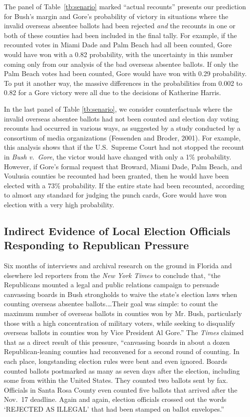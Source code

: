 \documentclass[11pt,titlepage]{article}
\begin{document}
The panel of Table~\ref{tb:senario} marked ``actual recounts''
presents our prediction for Bush's margin and Gore's probability of
victory in situations where the invalid overseas absentee ballots had
been rejected \emph{and} the recounts in one or both of these counties
had been included in the final tally.  For example, if the recounted
votes in Miami Dade and Palm Beach had all been counted, Gore would
have won with a 0.82 probability, with the uncertainty in this number
coming only from our analysis of the bad overseas absentee ballots.
If only the Palm Beach votes had been counted, Gore would have won
with 0.29 probability.  To put it another way, the massive differences
in the probabilities from 0.002 to 0.82 for a Gore victory were all
due to the decisions of Katherine Harris.

In the last panel of Table \ref{tb:senario}, we consider
counterfactuals where the invalid overseas absentee ballots had not
been counted and election day voting recounts had occurred in various
ways, as suggested by a study conducted by a consortium of media
organizations (Fessenden and Broder, 2001).  For example, this
analysis shows that if the U.S.\ Supreme Court had not stopped the
recount in \emph{Bush v.\ Gore}, the victor would have changed with
only a 1\% probability.  However, if Gore's formal request that
Broward, Miami Dade, Palm Beach, and Voulusia counties be recounted
had been granted, then he would have been elected with a 73\%
probability.  If the entire state had been recounted, according to
almost any standard for judging the punch cards, Gore would have won
election with a very high probability.

\subsection{Indirect Evidence of Local Election Officials Responding
  to Republican Pressure}

Six months of interviews and archival research on the ground in
Florida and elsewhere led reporters from the \emph{New York Times}
to conclude that, ``the Republicans mounted a legal and public
relations campaign to persuade canvassing boards in Bush strongholds
to waive the state's election laws when counting overseas absentee
ballots.\ldots Their goal was simple: to count the maximum number of
overseas ballots in counties won by Mr.  Bush, particularly those with
a high concentration of military voters, while seeking to disqualify
overseas ballots in counties won by Vice President Al Gore.''  The
\emph{Times} claimed that as a direct result of this pressure,
``canvassing boards in about a dozen Republican-leaning counties had
reconvened for a second round of counting.  In each place,
longstanding election rules were bent and even ignored.  Boards
counted ballots postmarked as many as seven days after the election,
including some from within the United States.  They counted two
ballots sent by fax.  Officials in Santa Rosa County even counted five
ballots that arrived after the Nov.\ 17 deadline.  Again and again,
election officials crossed out the words `REJECTED AS ILLEGAL' that
had been stamped on ballot envelopes.''
\end{document}
